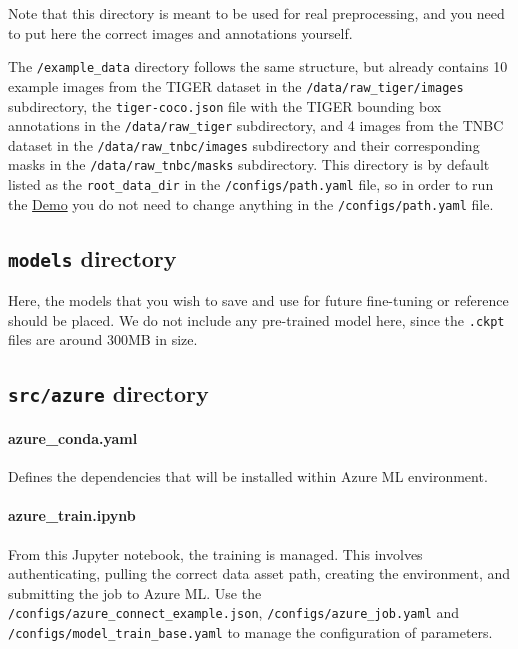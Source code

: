 Note that this directory is meant to be used for real preprocessing, and
you need to put here the correct images and annotations yourself.

The \texttt{/example\_data} directory follows the same structure,
but already contains 10 example images from the TIGER dataset in the
\texttt{/data/raw\_tiger/images} subdirectory, the
\texttt{tiger-coco.json} file with the TIGER bounding box annotations in
the \texttt{/data/raw\_tiger} subdirectory, and 4 images from the TNBC
dataset in the \texttt{/data/raw\_tnbc/images} subdirectory and their
corresponding masks in the \texttt{/data/raw\_tnbc/masks} subdirectory.
This directory is by default listed as the \texttt{root\_data\_dir} in
the \texttt{/configs/path.yaml} file, so in order to run the
\hyperref[how-to-run-the-demo]{Demo} you do not need to change anything
in the \texttt{/configs/path.yaml} file.

\subsection{\texttt{models} directory}\label{models-directory}

Here, the models that you wish to save and use for future fine-tuning or
reference should be placed. We do not include any pre-trained model here,
since the \texttt{.ckpt} files are around 300MB in size.

\subsection{\texttt{src/azure} directory}\label{srcazure-directory}

\paragraph{azure\_conda.yaml}
Defines the dependencies that will be installed within Azure ML
environment.

\paragraph{azure\_train.ipynb}
From this Jupyter notebook, the training is managed. This involves
authenticating, pulling the correct data asset path, creating the
environment, and submitting the job to Azure ML. Use the \\
\texttt{/configs/azure\_connect\_example.json},
\texttt{/configs/azure\_job.yaml} and \\
\texttt{/configs/model\_train\_base.yaml} to manage the configuration of
parameters.

